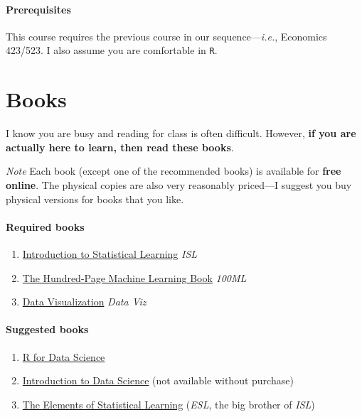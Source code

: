 \documentclass[10pt]{article}
\newcommand{\emf}[1]{\textbf{\textcolor{grass_green}{#1}}}
\begin{document}
\paragraph{Prerequisites} This course requires the previous course in our sequence---\textit{i.e.}, Economics 423/523. I also assume you are comfortable in \texttt{R}.

\section*{Books} I know you are busy and reading for class is often difficult. However, \emf{if you are actually here to learn, then read these books}.

\bigskip

\noindent\textit{Note} Each book (except one of the recommended books) is available for \emf{free online}. The physical copies are also very reasonably priced---I suggest you buy physical versions for books that you like.

\paragraph{Required books}

\begin{enumerate}
\item \href{https://www-bcf.usc.edu/~gareth/ISL/}{Introduction to Statistical Learning} \textit{ISL}
\item \href{http://themlbook.com/}{The Hundred-Page Machine Learning Book} \textit{100ML}
\item \href{https://socviz.co/}{Data Visualization} \textit{Data Viz}
\end{enumerate}

\paragraph{Suggested books}

\begin{enumerate}
\item \href{https://r4ds.had.co.nz/}{R for Data Science}
\item \href{https://www.springer.com/us/book/9783319500164}{Introduction to Data Science} (not available without purchase)
\item \href{http://web.stanford.edu/~hastie/ElemStatLearn/}{The Elements of Statistical Learning} (\textit{ESL}, the big brother of \textit{ISL})
\end{enumerate}
\end{document}
